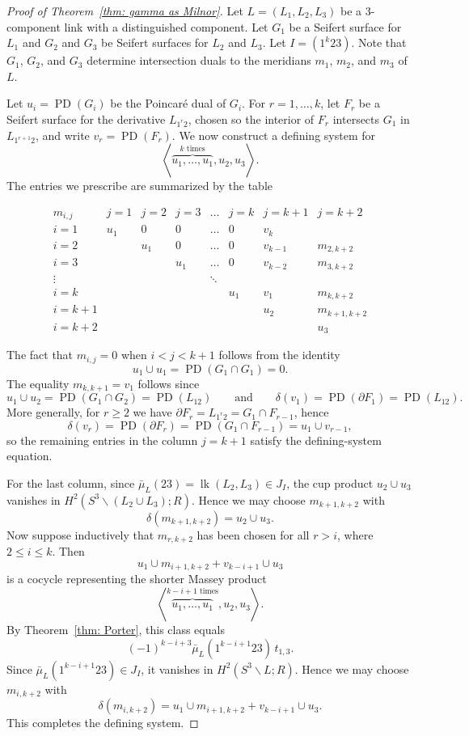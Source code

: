 \documentclass[a4paper, 11pt]{amsart}
\theoremstyle{definition}
\newcommand{\Z}{\mathbb{Z}}
\newcommand{\lk}{\operatorname{lk}}
\newcommand{\PD}{\operatorname{PD}}
\begin{document}
\begin{proof}[Proof of Theorem~\ref{thm: gamma as Milnor}]
Let $L=(L_1,L_2,L_3)$ be a $3$-component link with a 
distinguished component.
Let $G_1$ be a Seifert surface for $L_1$
and
$G_2$ and $G_3$ be Seifert surfaces for $L_2$ and $L_3$.
Let $I=(1^k23)$. Note that $G_1$, $G_2$, and $G_3$ determine
intersection duals to the meridians $m_1$, $m_2$, and $m_3$ of $L$.

Let $u_i=\PD(G_i)$ be the Poincar\'e dual of $G_i$. For $r=1,\dots,k$, let $F_r$ be a Seifert surface for the derivative $L_{1^r2}$, chosen so the interior of $F_r$ intersects $G_1$ in $L_{1^{r+1}2}$, and write $v_r=\PD(F_r)$. We now construct a defining system for
\[
\left\langle \overbrace{u_1,\dots,u_1}^{k\text{ times}},u_2,u_3\right\rangle.
\]
The entries we prescribe are summarized by the table

\begin{equation*}
\begin{array}{c|ccccccc}
m_{i,j}&j=1&j=2&j=3&\dots&j=k&j=k+1&j=k+2\\\hline
i=1&u_1&0&0&\dots&0&v_{k}&
\\
i=2&&u_1&0&\dots&0&v_{k-1}&m_{2,k+2}
\\
i=3&&&u_1&\dots&0&v_{k-2}&m_{3,k+2}
\\
\vdots&&&&\ddots
\\
i=k&&&&&u_1&v_1&m_{k,k+2}
\\
i=k+1&&&&&&u_2&m_{k+1,k+2}
\\
i=k+2&&&&&&&u_3
\end{array}
\end{equation*}

The fact that $m_{i,j}=0$ when $i<j<k+1$ follows from the identity
\[
u_1\cup u_1=\PD(G_1\cap G_1)=0.
\]
The equality $m_{k,k+1}=v_1$ follows since
\[
u_1\cup u_2=\PD(G_1\cap G_2)=\PD(L_{12})
\qquad\text{and}\qquad
\delta(v_1)=\PD(\partial F_1)=\PD(L_{12}).
\]
More generally, for $r\ge 2$ we have $\partial F_r=L_{1^r2}=G_1\cap F_{r-1}$, hence
\[
\delta(v_r)=\PD(\partial F_r)=\PD(G_1\cap F_{r-1})=u_1\cup v_{r-1},
\]
so the remaining entries in the column $j=k+1$ satisfy the defining-system equation.

For the last column, since $\bar{\mu}_L(23)=\lk(L_2,L_3)\in J_I$, the cup product $u_2\cup u_3$ vanishes in $H^2(S^3\smallsetminus (L_2\cup L_3);R)$. Hence we may choose $m_{k+1,k+2}$ with
\[
\delta(m_{k+1,k+2})=u_2\cup u_3.
\]
Now suppose inductively that $m_{r,k+2}$ has been chosen for all $r>i$, where $2\le i\le k$.
Then
\[
u_1\cup m_{i+1,k+2}+v_{k-i+1}\cup u_3
\]
is a cocycle representing the shorter Massey product
\[
\left\langle \overbrace{u_1,\dots,u_1}^{k-i+1\text{ times}},u_2,u_3\right\rangle.
\]
By Theorem~\ref{thm: Porter}, this class equals
\[
(-1)^{k-i+3}\bar{\mu}_L(1^{k-i+1}23)\,t_{1,3}.
\]
Since $\bar{\mu}_L(1^{k-i+1}23)\in J_I$, it vanishes in $H^2(S^3\smallsetminus L;R)$. Hence we may choose $m_{i,k+2}$ with
\[
\delta(m_{i,k+2})=u_1\cup m_{i+1,k+2}+v_{k-i+1}\cup u_3.
\]
This completes the defining system.


\end{proof}
\end{document}

